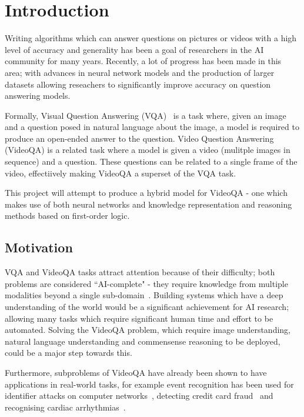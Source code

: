 \documentclass[../interim.tex]{subfiles}
\begin{document}
\section{Introduction}
\label{section:intro}

Writing algorithms which can answer questions on pictures or videos with a high level of accuracy and generality has been a goal of researchers in the AI community for many years. Recently, a lot of progress has been made in this area; with advances in neural network models and the production of larger datasets allowing reseachers to significantly improve accuracy on question answering models.

Formally, Visual Question Answering (VQA)~\cite{vqa-intro} is a task where, given an image and a question posed in natural language about the image, a model is required to produce an open-ended answer to the question. Video Question Answering (VideoQA) is a related task where a model is given a video (mulitple images in sequence) and a question. These questions can be related to a single frame of the video, effectiively making VideoQA a superset of the VQA task.

This project will attempt to produce a hybrid model for VideoQA - one which makes use of both neural networks and knowledge representation and reasoning methods based on first-order logic.


\subsection{Motivation}

VQA and VideoQA tasks attract attention because of their difficulty; both problems are considered ``AI-complete" - they require knowledge from multiple modalities beyond a single sub-domain~\cite{def:ai-complete}. Building systems which have a deep understanding of the world would be a significant achievement for AI research; allowing many tasks which require significant human time and effort to be automated. Solving the VideoQA problem, which require image understanding, natural language understanding and commensense reasoning to be deployed, could be a major step towards this.

Furthermore, subproblems of VideoQA have already been shown to have applications in real-world tasks, for example event recognition has been used for identifier attacks on computer networks~\cite{ED-uses:networks}, detecting credit card fraud~\cite{ED-uses:fraud} and recognising cardiac arrhythmias~\cite{ED-uses:cardiac}.
\end{document}
